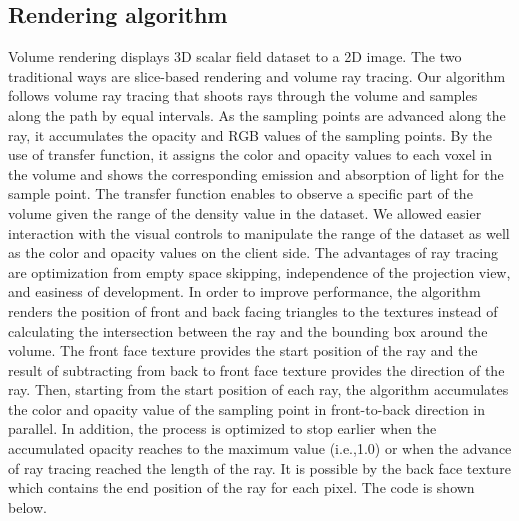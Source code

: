 \documentclass[annual]{acmsiggraph}
\begin{document}
\subsection{Rendering algorithm}
	Volume rendering displays 3D scalar field dataset to a 2D image. The two traditional ways are slice-based rendering and volume ray tracing. Our algorithm follows volume ray tracing that shoots rays through the volume and samples along the path by equal intervals. As the sampling points are advanced along the ray, it accumulates the opacity and RGB values of the sampling points. By the use of transfer function, it assigns the color and opacity values to each voxel in the volume and shows the corresponding emission and absorption of light for the sample point. The transfer function enables to observe a specific part of the volume given the range of the density value in the dataset. We allowed easier interaction with the visual controls to manipulate the range of the dataset as well as the color and opacity values on the client side. 
The advantages of ray tracing are optimization from empty space skipping, independence of the projection view, and easiness of development. In order to improve performance, the algorithm renders the position of front and back facing triangles to the textures instead of calculating the intersection between the ray and the bounding box around the volume. The front face texture provides the start position of the ray and the result of subtracting from back to front face texture provides the direction of the ray. Then, starting from the start position of each ray, the algorithm accumulates the color and opacity value of the sampling point in front-to-back direction in parallel. In addition, the process is optimized to stop earlier when the accumulated opacity reaches to the maximum value (i.e.,1.0) or when the advance of ray tracing reached the length of the ray. It is possible by the back face texture which contains the end position of the ray for each pixel. The code is shown below.
\end{document}
